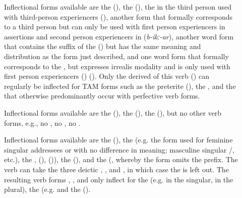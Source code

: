 \begin{description}
\item[ ]
		Inflectional forms available are the  (), the  (), the  in the third person used with third-person experiencers (), another  form that formally corresponds to a third person but can only be used with first person experiencers in assertions and second person experiencers in  (\textit{b-ikː-ar}), another word form that contains the suffix of the  () but has the same meaning and distribution as the form just described, and one word form that formally corresponds to the , but expresses irrealis modality and is only used with first person experiencers () (). Only the derived  of this verb () can regularly be inflected for TAM forms such as the preterite (), the , and the  that otherwise predominantly occur with perfective verb forms.

\item[ ]
		Inflectional forms available are the  (), the  (), the  (), but no other verb forms, e.g., no , no , no .
		
\item[ ]
		Inflectional forms available are the  (), the  (e.g. the form used for feminine singular addressees  or  with no difference in meaning; masculine singular \slash{}, etc.), the ,  (),  ()), the  (), and the  (, whereby the  form omits the  prefix. The verb can take the three deictic  , , and , in which case the   is left out. The resulting verb forms , , and  only inflect for the  (e.g.  in the singular,  in the plural), the  (e.g.  and the  ().
\end{description}

